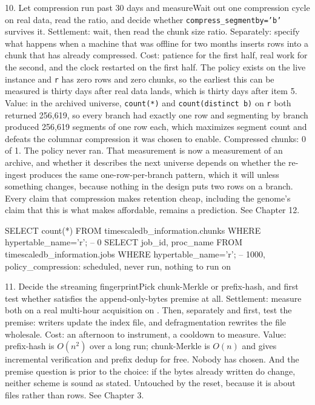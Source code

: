 \begin{Open}{10. Let compression run past 30 days and measure}{Wait out one compression cycle on real data, read the ratio, and decide whether \texttt{compress\_segmentby='b'} survives it.}
Settlement: wait, then read the chunk size ratio. Separately: specify what happens when a machine that was offline for two months inserts rows into a chunk that has already compressed. Cost: patience for the first half, real work for the second, and the clock restarted on the first half. The policy exists on the live instance and \texttt{r} has zero rows and zero chunks, so the earliest this can be measured is thirty days after real data lands, which is thirty days after item 5. Value: in the archived universe, \texttt{count(*)} and \texttt{count(distinct b)} on \texttt{r} both returned 256,619, so every branch had exactly one row and segmenting by branch produced 256,619 segments of one row each, which maximizes segment count and defeats the columnar compression it was chosen to enable. Compressed chunks: 0 of 1. The policy never ran. That measurement is now a measurement of an archive, and whether it describes the next universe depends on whether the re-ingest produces the same one-row-per-branch pattern, which it will unless something changes, because nothing in the design puts two rows on a branch. Every claim that compression makes retention cheap, including the genome's claim that this is what makes  affordable, remains a prediction. See Chapter 12.
\begin{Check}
SELECT count(*) FROM timescaledb_information.chunks WHERE hypertable_name='r';  -- 0
SELECT job_id, proc_name FROM timescaledb_information.jobs WHERE hypertable_name='r';
  -- 1000, policy_compression: scheduled, never run, nothing to run on
\end{Check}
\end{Open}

\begin{Open}{11. Decide the streaming fingerprint}{Pick chunk-Merkle or prefix-hash, and first test whether \labFileFormat{} satisfies the append-only-bytes premise at all.}
Settlement: measure both on a real multi-hour \labFileFormat{} acquisition on \labColdSystemShort{}. Then, separately and first, test the premise: \labDAQ{} writers update the index file, and defragmentation rewrites the file wholesale. Cost: an afternoon to instrument, a cooldown to measure. Value: prefix-hash is $O(n^2)$ over a long run; chunk-Merkle is $O(n)$ and gives incremental verification and prefix dedup for free. Nobody has chosen. And the premise question is prior to the choice: if the bytes already written do change, neither scheme is sound as stated. Untouched by the reset, because it is about files rather than rows. See Chapter 3.
\end{Open}

